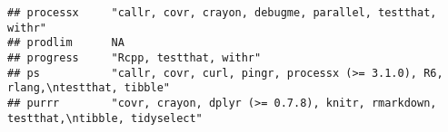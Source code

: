 \documentclass[]{article}
\begin{document}
\begin{verbatim}
## processx     "callr, covr, crayon, debugme, parallel, testthat, withr"                                                                                                                                                                                                                                                                                                                                                                                                                                                                                                                                 
## prodlim      NA                                                                                                                                                                                                                                                                                                                                                                                                                                                                                                                                                                                        
## progress     "Rcpp, testthat, withr"                                                                                                                                                                                                                                                                                                                                                                                                                                                                                                                                                                   
## ps           "callr, covr, curl, pingr, processx (>= 3.1.0), R6, rlang,\ntestthat, tibble"                                                                                                                                                                                                                                                                                                                                                                                                                                                                                                             
## purrr        "covr, crayon, dplyr (>= 0.7.8), knitr, rmarkdown, testthat,\ntibble, tidyselect"                                                                                                                                                                                                                                                                                                                                                                                                                                                                                                         

\end{verbatim}
\end{document}
